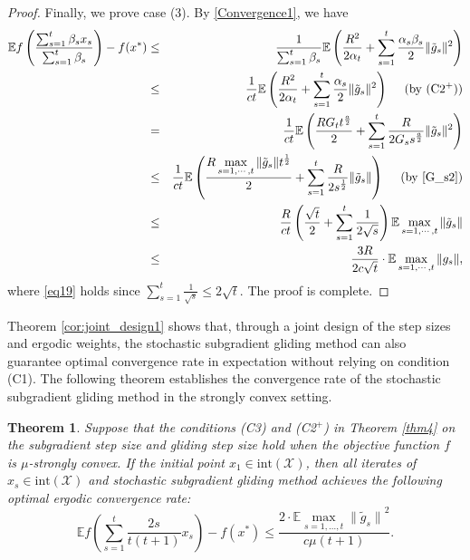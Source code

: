 \documentclass[sn-mathphys]{JORSC-jnl}%
\theoremstyle{thmstyleone}%
\newtheorem{theorem}{Theorem}[section]%
\theoremstyle{thmstylethree}%
\begin{document}
\begin{proof}
	Finally, we prove case (3). By \eqref{Convergence1}, we have
	\begin{eqnarray}
		\mathbb{E}f\left( \frac{\sum_{s=1}^t \beta_s x_s}{\sum_{s=1}^t \beta_s} \right) - f(x^*) 
		&\leq& \frac{1}{\sum_{s=1}^t \beta_s}\mathbb{E}\left(\frac{R^2}{2\alpha_t}+\sum_{s=1}^{t}\frac{\alpha_s\beta_s}{2}\Vert \tilde{g}_s \Vert^2\right)\nonumber\\
		&\leq& \frac{1}{ct}\mathbb{E}\left(\frac{R^2}{2\alpha_t}+\sum_{s=1}^{t}\frac{\alpha_s}{2}\Vert \tilde{g}_s \Vert^2\right)~~~~({\rm by~ (C2^+)})\nonumber\\
		&=& \frac{1}{ct}\mathbb{E}\left(\frac{RG_t t^{\frac{a}{2}}}{2}+\sum_{s=1}^{t}\frac{R}{2G_s s^{\frac{a}{2}}}\Vert \tilde{g}_s \Vert^2\right)\nonumber\\
		&\leq&
		\frac{1}{ct}\mathbb{E}\left(\frac{R\max\limits_{s=1,\cdots,t}{\|\tilde{g}_s\|} t^{\frac{1}{2}}}{2}+\sum_{s=1}^{t}\frac{R}{2 s^{\frac{1}{2}}}\Vert \tilde{g}_s \Vert\right)~~~~({\rm by~ \eqref{G_s2}})\nonumber\\
		&\leq&
		\frac{R}{ct}\left(\frac{\sqrt{t}}{2}+\sum_{s=1}^{t}\frac{1}{2\sqrt{s}}\right)\mathbb{E}\max\limits_{s=1,\cdots,t}{\|\tilde{g}_s\|}\nonumber\\
		&\leq& \frac{3R}{2c\sqrt{t}}\cdot \mathbb{E}\max_{s=1,\cdots,t}\|g_s\|, \label{eq19}
	\end{eqnarray}
	where \eqref{eq19} holds since $\sum_{s=1}^{t} \frac{1}{\sqrt{s}} \le 2\sqrt{t}$. The proof is complete.
\end{proof}

Theorem \ref{cor:joint_design1} shows that, through a joint design of the step sizes and ergodic weights, the stochastic subgradient gliding method can also guarantee optimal convergence rate in expectation without relying on condition (C1). The following theorem establishes the convergence rate of the stochastic subgradient gliding method in the strongly convex setting.

\begin{theorem}\label{thm6}
	Suppose that the conditions (C3) and (C2$^+$) in Theorem \ref{thm4} on the subgradient step size and gliding step size hold when the objective function $f$ is $\mu$-strongly convex. If the initial point $x_1 \in \text
	{int}(\mathcal{X})$, then all iterates of $x_s \in \text{int}(\mathcal{X})$ and stochastic subgradient gliding method achieves the following optimal ergodic convergence rate:
	\begin{equation}\label{conver3}
		\mathbb{E}f\left(\sum_{s=1}^t\frac{2s}{t(t+1)}x_s\right)-f(x^*)\leq
		\frac{2\cdot\mathbb{E}\max\limits_{s=1,\dots,t}{\|\tilde{g}_s\|}^2}{c\mu(t+1)}.
	\end{equation}
\end{theorem}
\end{document}
